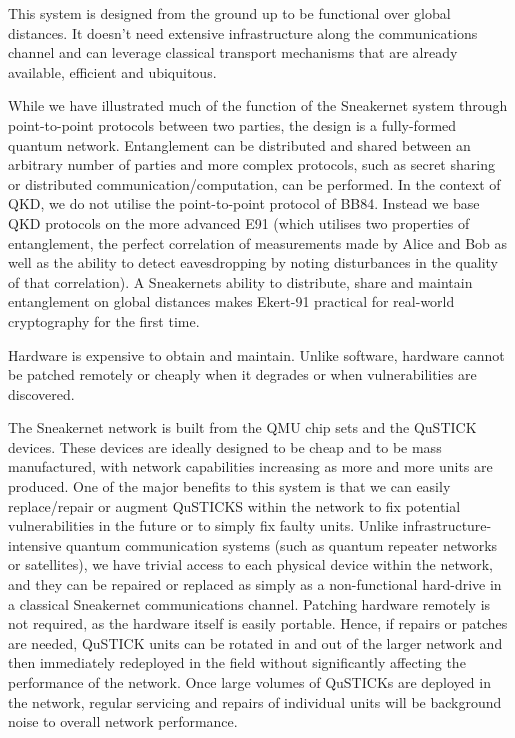 \documentclass[twocolumn, aps, rmp, amsmath, amssymb, nofootinbib, superscriptaddress, longbibliography, floatfix, table-of-contents, eqsecnum]{revtex4-2}
\begin{document}
This system is designed from the ground up to be functional over global distances. It doesn't need extensive infrastructure along the communications channel and can leverage classical transport mechanisms that are already available, efficient and ubiquitous. 

While we have illustrated much of the function of the Sneakernet system through point-to-point protocols between two parties, the design is a fully-formed quantum network. Entanglement can be distributed and shared between an arbitrary number of parties and more complex protocols, such as secret sharing or distributed communication/computation, can be performed. In the context of QKD, we do not utilise the point-to-point protocol of BB84. Instead we base QKD protocols on the more advanced E91 (which utilises two properties of entanglement, the perfect correlation of measurements made by Alice and Bob as well as the ability to detect eavesdropping by noting disturbances in the quality of that correlation). A Sneakernets ability to distribute, share and maintain entanglement on global distances makes Ekert-91 practical for real-world cryptography for the first time.

Hardware is expensive to obtain and maintain. Unlike software, hardware cannot be patched remotely or cheaply when it degrades or when vulnerabilities are discovered.

The Sneakernet network is built from the QMU chip sets and the QuSTICK devices. These devices are ideally designed to be cheap and to be mass manufactured, with network capabilities increasing as more and more units are produced. One of the major benefits to this system is that we can easily replace/repair or augment QuSTICKS within the network to fix potential vulnerabilities in the future or to simply fix faulty units. Unlike infrastructure-intensive quantum communication systems (such as quantum repeater networks or satellites), we have trivial access to each physical device within the network, and they can be repaired or replaced as simply as a non-functional hard-drive in a classical Sneakernet communications channel. Patching hardware remotely is not required, as the hardware itself is easily portable. Hence, if repairs or patches are needed, QuSTICK units can be rotated in and out of the larger network and then immediately redeployed in the field without significantly affecting the performance of the network. Once large volumes of QuSTICKs are deployed in the network, regular servicing and repairs of individual units will be background noise to overall network performance. 
\end{document}
